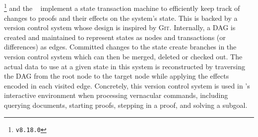 \subsection*{\Coq}

\Coq\footnote{\Coq \texttt{v8.18.0}} and the \CoqIDE~\cite{Coq, bertot2013interactive} implement a state transaction machine to efficiently keep track of changes to proofs and their effects on the system's state.
This is backed by a version control system whose design is inspired by \textsc{Git}.
Internally, a \ac{DAG} is created and maintained to represent states as nodes and transactions (or differences) as edges.
Committed changes to the state create branches in the version control system which can then be merged, deleted or checked out.
The actual data to use at a given state in this system is reconstructed by traversing the \ac{DAG} from the root node to the target node while applying the effects encoded in each visited edge.
Concretely, this version control system is used in \Coq's interactive environment when processing vernacular commands, including querying documents, starting proofs, stepping in a proof, and solving a subgoal.

